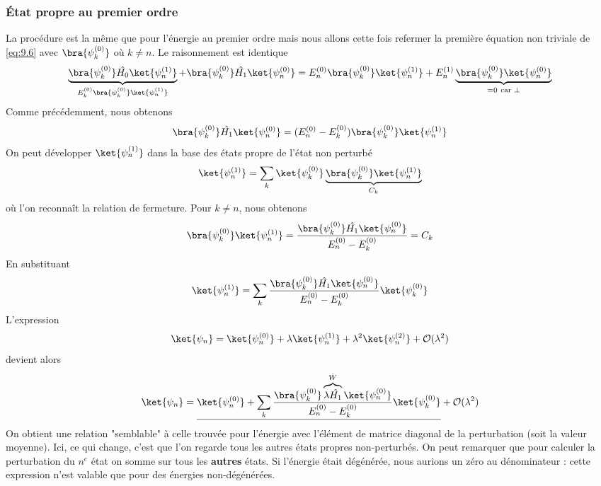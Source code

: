 		\subsubsection{État propre au premier ordre}
		La procédure est la même que pour l'énergie au premier ordre mais nous allons cette 
		fois refermer la première équation non triviale de \eqref{eq:9.6} avec 
		$\bra{\psi_k^{(0)}}$ où $k\neq n$. Le raisonnement est identique
		\begin{equation}				
		\underbrace{\bra{\psi_k^{(0)}}\hat{H_0}\ket{\psi_n^{(1)}}}_{E_k^{(0)}
		\bra{\psi_k^{(0)}}\ket{\psi_n^{(1)}}}+\bra{\psi_k^{(0)}}\hat{H_1}\ket{\psi_n^{(0)}} =
		E_n^{(0)}\bra{\psi_k^{(0)}}\ket{\psi_n^{(1)}}+E_n^{(1)}
		\underbrace{\bra{\psi_k^{(0)}}\ket{\psi_n^{(0)}}}_{=0\ \text{car }\perp}
		\end{equation}
		Comme précédemment, nous obtenons
		\begin{equation}
		\bra{\psi_k^{(0)}}\hat{H_1}\ket{\psi_n^{(0)}} = (E_n^{(0)}-E_k^{(0)})
		\bra{\psi_k^{(0)}}\ket{\psi_n^{(1)}}
		\end{equation}
		On peut développer $\ket{\psi_n^{(1)}}$ dans la base des états propre de
		l'état non perturbé
		\begin{equation}
		\ket{\psi_n^{(1)}} = \sum_k \ket{\psi_k^{(0)}}\underbrace{\bra{\psi_k^{(0)}}\ket{\psi_n^{(1)}}}_{
		C_k}	
		\end{equation}
		où l'on reconnaît la relation de fermeture. Pour $k\neq n$, nous obtenons
		\begin{equation}
		\bra{\psi_k^{(0)}}\ket{\psi_n^{(1)}} = \dfrac{\bra{\psi_k^{(0)}}\hat{H_1}\ket{\psi_n^{(0)}}}{
		E_n^{(0)}-E_k^{(0)}} = C_k
		\end{equation}
		En substituant
		\begin{equation}
		\ket{\psi_n^{(1)}} = \sum_k \dfrac{\bra{\psi_k^{(0)}}\hat{H_1}\ket{\psi_n^{(0)}}}{
		E_n^{(0)}-E_k^{(0)}} \ket{\psi_k^{(0)}}
		\end{equation}
		L'expression
		\begin{equation}
		\ket{\psi_n} = 	\ket{\psi_n^{(0)}}+\lambda\ket{\psi_n^{(1)}}+\lambda^2\ket{
		\psi_n^{(2)}}+\mathcal{O}(\lambda^2)
		\end{equation}
		devient alors
		\begin{equation}
		\ket{\psi_n} = \underline{\ket{\psi_n^{(0)}} + \sum_k	\dfrac{\bra{\psi_k^{(0)}}\overbrace{
		\lambda\hat{H_1}}^{	\hat{W}}\ket{\psi_n^{(0)}}}{E_n^{(0)}-E_k^{(0)}} \ket{\psi_k^{(0)}}} + 
		\mathcal{O}(\lambda^2)
		\end{equation}	
		On obtient une relation "semblable" à celle trouvée pour l'énergie avec l'élément 
		de matrice 	diagonal de la perturbation (soit la valeur moyenne). Ici, ce qui change, 
		c'est que l'on regarde tous les autres états propres non-perturbés. On peut remarquer 
		que pour calculer la perturbation du $n^e$ état on somme sur tous les \textbf{autres} états. 
		Si l'énergie était dégénérée, nous aurions un zéro au dénominateur : cette expression n'est 
		valable que pour des énergies non-dégénérées.
		
